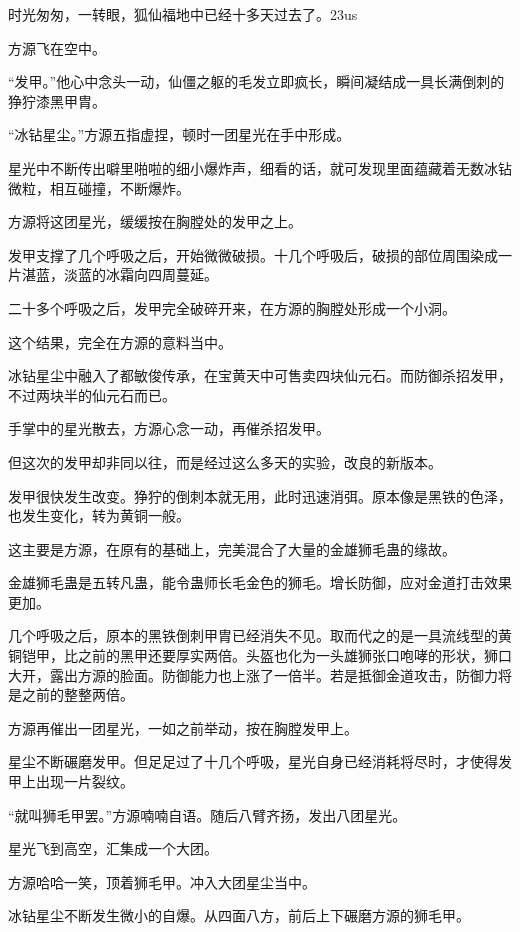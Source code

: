 
\begin{this_body}

时光匆匆，一转眼，狐仙福地中已经十多天过去了。23us

方源飞在空中。

“发甲。”他心中念头一动，仙僵之躯的毛发立即疯长，瞬间凝结成一具长满倒刺的狰狞漆黑甲胄。

“冰钻星尘。”方源五指虚捏，顿时一团星光在手中形成。

星光中不断传出噼里啪啦的细小爆炸声，细看的话，就可发现里面蕴藏着无数冰钻微粒，相互碰撞，不断爆炸。

方源将这团星光，缓缓按在胸膛处的发甲之上。

发甲支撑了几个呼吸之后，开始微微破损。十几个呼吸后，破损的部位周围染成一片湛蓝，淡蓝的冰霜向四周蔓延。

二十多个呼吸之后，发甲完全破碎开来，在方源的胸膛处形成一个小洞。

这个结果，完全在方源的意料当中。

冰钻星尘中融入了都敏俊传承，在宝黄天中可售卖四块仙元石。而防御杀招发甲，不过两块半的仙元石而已。

手掌中的星光散去，方源心念一动，再催杀招发甲。

但这次的发甲却非同以往，而是经过这么多天的实验，改良的新版本。

发甲很快发生改变。狰狞的倒刺本就无用，此时迅速消弭。原本像是黑铁的色泽，也发生变化，转为黄铜一般。

这主要是方源，在原有的基础上，完美混合了大量的金雄狮毛蛊的缘故。

金雄狮毛蛊是五转凡蛊，能令蛊师长毛金色的狮毛。增长防御，应对金道打击效果更加。

几个呼吸之后，原本的黑铁倒刺甲胄已经消失不见。取而代之的是一具流线型的黄铜铠甲，比之前的黑甲还要厚实两倍。头盔也化为一头雄狮张口咆哮的形状，狮口大开，露出方源的脸面。防御能力也上涨了一倍半。若是抵御金道攻击，防御力将是之前的整整两倍。

方源再催出一团星光，一如之前举动，按在胸膛发甲上。

星尘不断碾磨发甲。但足足过了十几个呼吸，星光自身已经消耗将尽时，才使得发甲上出现一片裂纹。

“就叫狮毛甲罢。”方源喃喃自语。随后八臂齐扬，发出八团星光。

星光飞到高空，汇集成一个大团。

方源哈哈一笑，顶着狮毛甲。冲入大团星尘当中。

冰钻星尘不断发生微小的自爆。从四面八方，前后上下碾磨方源的狮毛甲。


\end{this_body}
